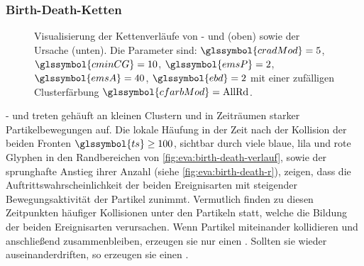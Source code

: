 \subsubsection*{Birth-Death-Ketten}\label{sec:bdketten}
\begin{figure}
	{\caption{Visualisierung der Kettenverläufe von - und  (oben) sowie der Ursache (unten). Die Parameter sind: $\glssymbol{cradMod} = 5$, $\glssymbol{cminCG} = 10$, $\glssymbol{emsP} = 2$, $\glssymbol{emsA} = 40$, $\glssymbol{ebd} = 2$ mit einer zufälligen Clusterfärbung $\glssymbol{cfarbMod} = \text{AllRd}$.}\label{fig:eva:birth-death-flow}}
\end{figure}

- und  treten gehäuft an kleinen Clustern und in Zeiträumen starker Partikelbewegungen auf. Die lokale Häufung in der Zeit nach der Kollision der beiden Fronten $\glssymbol{ts} \ge 100$, sichtbar durch viele blaue, lila und rote Glyphen in den Randbereichen von \autoref{fig:eva:birth-death-verlauf}, sowie der sprunghafte Anstieg ihrer Anzahl (siehe \autoref{fig:eva:birth-death-r}), zeigen, dass die Auftrittswahrscheinlichkeit der beiden Ereignisarten mit steigender Bewegungsaktivität der Partikel zunimmt. Vermutlich finden zu diesen Zeitpunkten häufiger Kollisionen unter den Partikeln statt, welche die Bildung  der beiden Ereignisarten verursachen. Wenn Partikel miteinander kollidieren und anschließend zusammenbleiben, erzeugen sie nur einen . Sollten sie wieder auseinanderdriften, so erzeugen sie einen .

